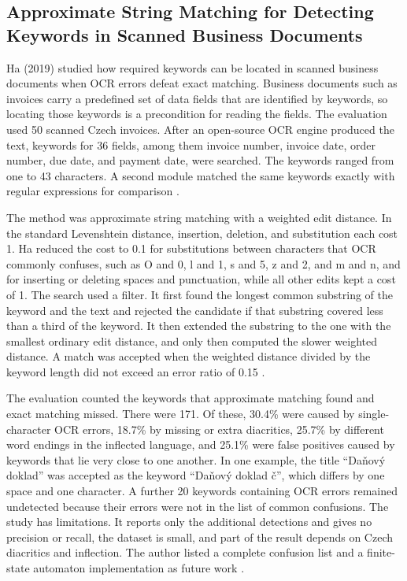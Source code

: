 \subsection{Approximate String Matching for Detecting Keywords in Scanned Business Documents}
\label{sec:related_ha_matching}

Ha (2019) studied how required keywords can be located in scanned business documents when OCR errors defeat exact matching.
Business documents such as invoices carry a predefined set of data fields that are identified by keywords, so locating those keywords is a precondition for reading the fields.
The evaluation used 50 scanned Czech invoices.
After an open-source OCR engine produced the text, keywords for 36 fields, among them invoice number, invoice date, order number, due date, and payment date, were searched.
The keywords ranged from one to 43 characters.
A second module matched the same keywords exactly with regular expressions for comparison \cite{docxb1}.

The method was approximate string matching with a weighted edit distance.
In the standard Levenshtein distance, insertion, deletion, and substitution each cost 1.
Ha reduced the cost to 0.1 for substitutions between characters that OCR commonly confuses, such as O and 0, l and 1, s and 5, z and 2, and m and n, and for inserting or deleting spaces and punctuation, while all other edits kept a cost of 1.
The search used a filter.
It first found the longest common substring of the keyword and the text and rejected the candidate if that substring covered less than a third of the keyword.
It then extended the substring to the one with the smallest ordinary edit distance, and only then computed the slower weighted distance.
A match was accepted when the weighted distance divided by the keyword length did not exceed an error ratio of 0.15 \cite{docxb1}.

The evaluation counted the keywords that approximate matching found and exact matching missed.
There were 171.
Of these, 30.4\% were caused by single-character OCR errors, 18.7\% by missing or extra diacritics, 25.7\% by different word endings in the inflected language, and 25.1\% were false positives caused by keywords that lie very close to one another.
In one example, the title ``Da\v{n}ov\'y doklad'' was accepted as the keyword ``Da\v{n}ov\'y doklad \v{c}'', which differs by one space and one character.
A further 20 keywords containing OCR errors remained undetected because their errors were not in the list of common confusions.
The study has limitations.
It reports only the additional detections and gives no precision or recall, the dataset is small, and part of the result depends on Czech diacritics and inflection.
The author listed a complete confusion list and a finite-state automaton implementation as future work \cite{docxb1}.

